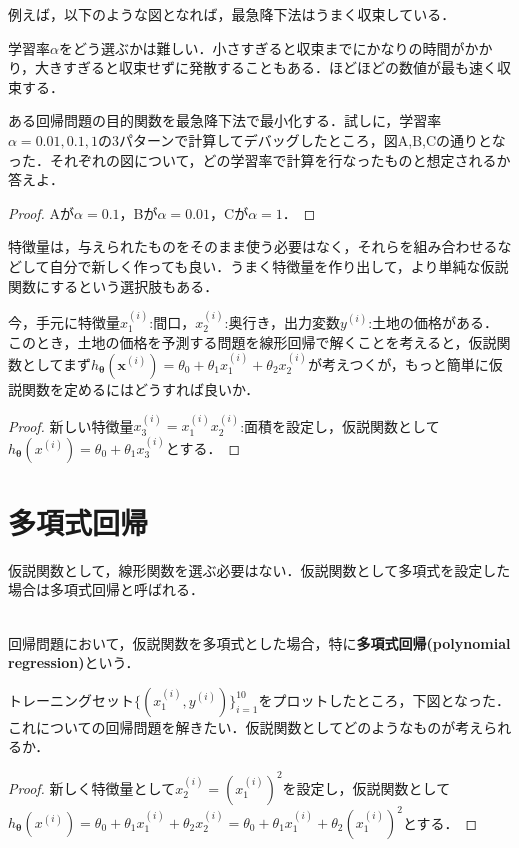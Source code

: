 例えば，以下のような図となれば，最急降下法はうまく収束している．

学習率$\alpha$をどう選ぶかは難しい．小さすぎると収束までにかなりの時間がかかり，大きすぎると収束せずに発散することもある．ほどほどの数値が最も速く収束する．

\begin{qu}
ある回帰問題の目的関数を最急降下法で最小化する．試しに，学習率$\alpha=0.01,0.1,1$の3パターンで計算してデバッグしたところ，図A,B,Cの通りとなった．それぞれの図について，どの学習率で計算を行なったものと想定されるか答えよ．

\end{qu}
\begin{proof}
Aが$\alpha =0.1$，Bが$\alpha =0.01$，Cが$\alpha =1$．
\end{proof}

特徴量は，与えられたものをそのまま使う必要はなく，それらを組み合わせるなどして自分で新しく作っても良い．うまく特徴量を作り出して，より単純な仮説関数にするという選択肢もある．

\begin{qu}
今，手元に特徴量$x_1^{(i)}$:間口，$x_2^{(i)}$:奥行き，出力変数$y^{(i)}$:土地の価格がある．このとき，土地の価格を予測する問題を線形回帰で解くことを考えると，仮説関数としてまず$h_{{\bm \theta}}({\bm x}^{(i)})=\theta_0+\theta_1 x_1^{(i)}+\theta_2 x_2^{(i)}$が考えつくが，もっと簡単に仮説関数を定めるにはどうすれば良いか．
\end{qu}
\begin{proof}
新しい特徴量$x_3^{(i)}=x_1^{(i)}x_2^{(i)}$:面積を設定し，仮説関数として$h_{{\bm \theta}}(x^{(i)})=\theta_0+\theta_1 x_3^{(i)}$とする．
\end{proof}

\section{多項式回帰}

仮説関数として，線形関数を選ぶ必要はない．仮説関数として多項式を設定した場合は多項式回帰と呼ばれる．
\begin{defi}[多項式回帰]
　\\
回帰問題において，仮説関数を多項式とした場合，特に{\bf 多項式回帰(polynomial regression)}という．
\end{defi}

\begin{qu}
トレーニングセット$\{(x_1^{(i)},y^{(i)})\}_{i=1}^10$をプロットしたところ，下図となった．これについての回帰問題を解きたい．仮説関数としてどのようなものが考えられるか．

\end{qu}
\begin{proof}
新しく特徴量として$x_2^{(i)}=(x_1^{(i)})^2$を設定し，仮説関数として$h_{{\bm \theta}}(x^{(i)})=\theta_0+\theta_1 x_1^{(i)}+\theta_2 x_2^{(i)}=\theta_0+\theta_1 x_1^{(i)}+\theta_2 (x_1^{(i)})^2$とする．
\end{proof}


